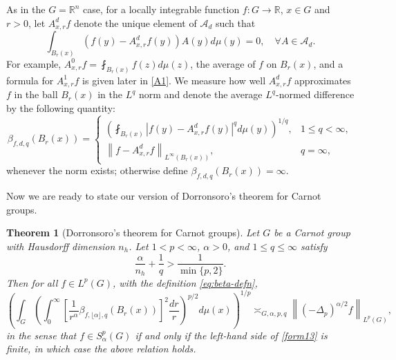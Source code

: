 \documentclass[11pt,reqno]{amsart}
\newtheorem{theorem}{Theorem}
\newcommand{\1}{\mathbf 1}
\begin{document}
As in the $G=\mathbb{R}^n$ case, for a locally integrable function $f:G\to\mathbb{R}$, $x\in G$ and $r>0$, let $A^d_{x,r}f$ denote the unique element of $\mathcal{A}_d$ such that
\[
\int_{B_r\left(x\right)}\left(f\left(y\right)-A^d_{x,r}f\left(y\right)\right)A\left(y\right)d\mu\left(y\right)=0,\quad \forall A\in \mathcal{A}_d.
\]
For example, $A^0_{x,r}f=\fint_{B_r\left(x\right)} f\left(z\right)d\mu\left(z\right)$, the average of $f$ on $B_r\left(x\right)$, and a formula for $A^1_{x,r}f$ is given later in \eqref{A1}. We measure how well $A^d_{x,r}f$ approximates $f$ in the ball $B_r\left(x\right)$ in the $L^q$ norm and denote the average $L^q$-normed difference by the following quantity:
\begin{equation}\label{eq:beta-defn}
\beta_{f,d,q}\left(B_r\left(x\right)\right)=
\begin{cases}
\left(\fint_{B_r\left(x\right)}\left|f\left(y\right)-A^d_{x,r}f\left(y\right)\right|^q d\mu\left(y\right)\right)^{1/q},& 1\le q<\infty,\\
\left\|f-A^d_{x,r}f\right\|_{L^\infty\left(B_r\left(x\right)\right)},& q=\infty,
\end{cases}
\end{equation}
whenever the norm exists; otherwise define $\beta_{f,d,q}\left(B_r\left(x\right)\right)=\infty$. 

Now we are ready to state our version of Dorronsoro's theorem for Carnot groups.
\begin{theorem}[Dorronsoro's theorem for Carnot groups]\label{lpgenthm}
Let $G$ be a Carnot group with Hausdorff dimension $n_h$. Let $1<p<\infty$, $\alpha>0$, and $1\le q\le\infty$ satisfy
\begin{equation}\label{eq:dorronsoro-condition}
    \frac{\alpha}{n_h}+\frac 1q>\frac{1}{\min\{p,2\}}.
\end{equation}
Then for all $f\in L^p\left(G\right)$, with the definition \eqref{eq:beta-defn},
\begin{equation}\label{form13}
\left(\int_G \left(\int_0^\infty \left[\frac 1{r^\alpha} \beta_{f,\lfloor \alpha \rfloor,q}\left(B_r\left(x\right)\right) \right]^2 \frac{dr}{r} \right)^{p/2} d\mu\left(x\right) \right)^{1/p} \asymp_{G,\alpha,p,q} \left\|\left(-\Delta_p\right)^{\alpha/2} f\right\|_{L^p\left(G\right)},
\end{equation}
in the sense that $f\in S^p_\alpha\left(G\right)$ if and only if the left-hand side of \eqref{form13} is finite, in which case the above relation holds.
\end{theorem}
\end{document}
